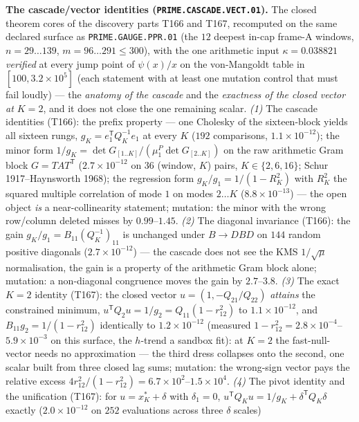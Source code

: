 \documentclass[11pt,a4paper]{article}
\begin{document}
\par\smallskip\noindent\textbf{The cascade/vector identities
(\texttt{PRIME.CASCADE.VECT.01}).}
The closed theorem cores of the discovery parts T166 and T167,
recomputed on the same declared surface as
\texttt{PRIME.GAUGE.PPR.01} (the $12$ deepest in-cap frame-A windows,
$n=29\ldots139$, $m=96\ldots291\le300$), with the one arithmetic input
$\kappa=0.038821$ \emph{verified} at every jump point of $\psi(x)/x$ on
the von-Mangoldt table in $[100,3.2\times10^{5}]$ (each statement with
at least one mutation control that must fail loudly) --- the
\emph{anatomy of the cascade} and the \emph{exactness of the closed
vector at $K=2$}, and it does not close the one remaining scalar.
\emph{(1)} The cascade identities (T166): the prefix property --- one
Cholesky of the sixteen-block yields all sixteen rungs,
$g_K=e_1^{\mathsf T}Q_K^{-1}e_1$ at every $K$ ($192$ comparisons,
$1.1\times10^{-12}$); the minor form
$1/g_K=\det G_{[1..K]}/(\mu^P_1\det G_{[2..K]})$ on the raw arithmetic
Gram block $G=TAT^{\mathsf T}$ ($2.7\times10^{-12}$ on $36$ (window,
$K$) pairs, $K\in\{2,6,16\}$; Schur 1917--Haynsworth 1968); the
regression form $g_K/g_1=1/(1-R_K^2)$ with $R_K^2$ the squared multiple
correlation of mode $1$ on modes $2\ldots K$ ($8.8\times10^{-13}$) ---
the open object \emph{is} a near-collinearity statement; mutation: the
minor with the wrong row/column deleted misses by $0.99$--$1.45$.
\emph{(2)} The diagonal invariance (T166): the gain
$g_K/g_1=B_{11}(Q_K^{-1})_{11}$ is unchanged under $B\to DBD$ on $144$
random positive diagonals ($2.7\times10^{-12}$) --- the cascade does
not see the KMS $1/\sqrt{\mu}$ normalisation, the gain is a property of
the arithmetic Gram block alone; mutation: a non-diagonal congruence
moves the gain by $2.7$--$3.8$. \emph{(3)} The exact $K=2$ identity
(T167): the closed vector $u=(1,-Q_{21}/Q_{22})$ \emph{attains} the
constrained minimum, $u^{\mathsf T}Q_2u=1/g_2=Q_{11}(1-r_{12}^2)$ to
$1.1\times10^{-12}$, and $B_{11}g_2=1/(1-r_{12}^2)$ identically to
$1.2\times10^{-12}$ (measured
$1-r_{12}^2=2.8\times10^{-4}$--$5.9\times10^{-3}$ on this surface, the
$h$-trend a sandbox fit): at $K=2$ the fast-null-vector needs no
approximation --- the third dress collapses onto the second, one scalar
built from three closed lag sums; mutation: the wrong-sign vector pays
the relative excess
$4r_{12}^2/(1-r_{12}^2)=6.7\times10^{2}$--$1.5\times10^{4}$.
\emph{(4)} The pivot identity and the unification (T167): for
$u=x^*_K+\delta$ with $\delta_1=0$,
$u^{\mathsf T}Q_Ku=1/g_K+\delta^{\mathsf T}Q_K\delta$ exactly
($2.0\times10^{-12}$ on $252$ evaluations across three $\delta$ scales)
\end{document}

